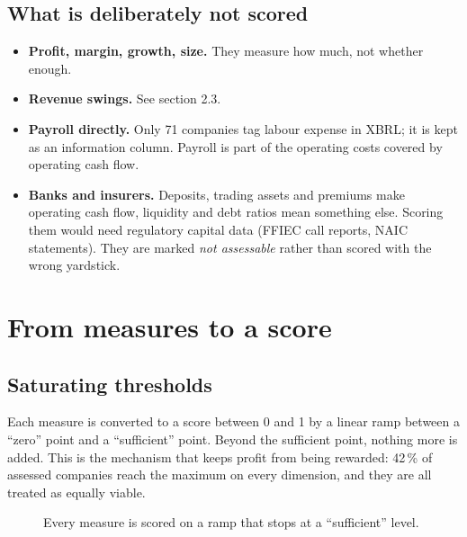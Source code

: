 \documentclass[11pt,a4paper]{article}
\begin{document}
\subsection{What is deliberately not scored}
\begin{itemize}
  \item \textbf{Profit, margin, growth, size.} They measure how much, not whether enough.
  \item \textbf{Revenue swings.} See section 2.3.
  \item \textbf{Payroll directly.} Only 71 companies tag labour expense in XBRL; it is kept as an information column. Payroll is part of the operating costs covered by operating cash flow.
  \item \textbf{Banks and insurers.} Deposits, trading assets and premiums make operating cash flow, liquidity and debt ratios mean something else. Scoring them would need regulatory capital data (FFIEC call reports, NAIC statements). They are marked \emph{not assessable} rather than scored with the wrong yardstick.
\end{itemize}

\section{From measures to a score}

\subsection{Saturating thresholds}
Each measure is converted to a score between 0 and 1 by a linear ramp between a ``zero'' point and a ``sufficient'' point. Beyond the sufficient point, nothing more is added. This is the mechanism that keeps profit from being rewarded: 42\,\% of assessed companies reach the maximum on every dimension, and they are all treated as equally viable.

\begin{figure}[h]
\centering
{}
\caption{Every measure is scored on a ramp that stops at a ``sufficient'' level.}
\end{figure}
\end{document}
